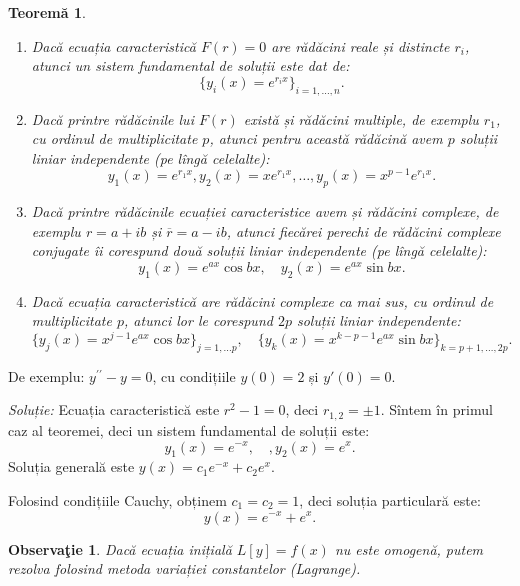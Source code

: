 \documentclass[11pt,a4paper]{article}
\theoremstyle{dotless}
\newtheorem{theorem}{Teorem\u{a}}[section]
\theoremstyle{dotlessdr}
\newtheorem{remark}{Observa\c{t}ie}[section]
\begin{document}
\begin{theorem}\label{thm:ec-car-dif}
  \begin{enumerate}[(1)]
  \item Dacă ecuația caracteristică $F(r) = 0$ are rădăcini reale și distincte $r_i$,
    atunci un sistem fundamental de soluții este dat de:
    \[
      \big\{ y_i(x) = e^{r_i x} \big\}_{i=1,\dots,n}.
    \]
  \item Dacă printre rădăcinile lui $F(r)$ există și rădăcini multiple, de exemplu
    $r_1$, cu ordinul de multiplicitate $p$, atunci pentru această rădăcină avem
    $p$ soluții liniar independente (pe lîngă celelalte):
    \[
      y_1(x) = e^{r_1 x}, y_2(x) = xe^{r_1 x}, \dots, y_p(x) = x^{p-1} e^{r_1 x}.
    \]
  \item Dacă printre rădăcinile ecuației caracteristice avem și rădăcini complexe,
    de exemplu $r = a + ib$ și $\overline{r} = a - ib$, atunci fiecărei perechi
    de rădăcini complexe conjugate îi corespund două soluții liniar independente
    (pe lîngă celelalte):
    \[
      y_1(x) = e^{ax} \cos bx, \quad y_2(x) = e^{ax} \sin bx.
    \]
  \item Dacă ecuația caracteristică are rădăcini complexe ca mai sus, cu ordinul
    de multiplicitate $p$, atunci lor le corespund $2p$ soluții liniar independente:
    \[
      \big\{ y_j(x) = x^{j-1} e^{ax} \cos bx \big\}_{j=1, \dots p}, \quad
      \big\{ y_k(x) = x^{k-p-1} e^{ax} \sin bx\big\}_{k=p+1, \dots, 2p}.
    \]
  \end{enumerate}
\end{theorem}

De exemplu: $y^{\prime\prime} - y = 0$, cu condițiile $y(0) = 2$ și $y'(0) = 0$.

\emph{Soluție:} Ecuația caracteristică este $r^2 - 1 = 0$, deci $r_{1,2} = \pm 1$.
Sîntem în primul caz al teoremei, deci un sistem fundamental de soluții este:
\[
  y_1(x) = e^{-x}, \quad, y_2(x) = e^x.
\]
Soluția generală este $y(x) = c_1 e^{-x} + c_2 e^x$.

Folosind condițiile Cauchy, obținem $c_1 = c_2 = 1$, deci soluția particulară este:
\[
  y(x) = e^{-x} + e^x.
\]

\vspace{1cm}

\begin{remark}\label{rk:neomogen}
  Dacă ecuația inițială $L[y] = f(x)$ \emph{nu} este omogenă, putem rezolva folosind
  \emph{metoda variației constantelor (Lagrange)}.
\end{remark}
\end{document}
